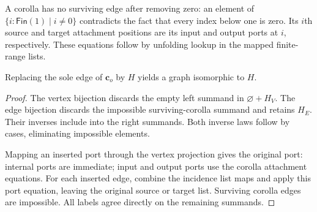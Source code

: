 A corolla has no surviving edge after removing zero: an element of
$\{i:\mathsf{Fin}(1)\mid i\ne0\}$ contradicts the fact that every index below
one is zero. Its $i$th source and target attachment positions are its input
and output ports at $i$, respectively. These equations follow by unfolding
lookup in the mapped finite-range lists.

\begin{lemma}
Replacing the sole edge of $\mathbf c_o$ by $H$ yields a graph isomorphic to $H$.
\end{lemma}
\begin{proof}
The vertex bijection discards the empty left summand in $\varnothing+H_V$.
The edge bijection discards the impossible surviving-corolla summand and retains
$H_E$. Their inverses include into the right summands. Both inverse laws follow
by cases, eliminating impossible elements.

Mapping an inserted port through the vertex projection gives the original port:
internal ports are immediate; input and output ports use the corolla attachment
equations. For each inserted edge, combine the incidence list maps and apply
this port equation, leaving the original source or target list. Surviving
corolla edges are impossible. All labels agree directly on the remaining
summands.
\end{proof}


